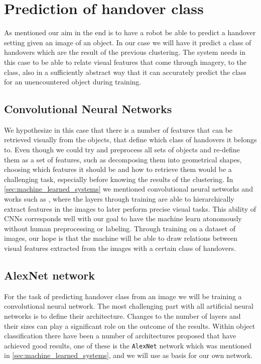 \section{Prediction of handover class}

As mentioned our aim in the end is to have a robot be able to predict a handover setting given an image of an object. In our case we will have it predict a class of handovers which are the result of the previous clustering. The system needs in this case to be able to relate visual features that come through imagery, to the class, also in a sufficiently abstract way that it can accurately predict the class for an unencountered object during training.

\subsection{Convolutional Neural Networks}

We hypothesize in this case that there is a number of features that can be retrieved visually from the objects, that define which class of handovers it belongs to. Even though we could try and preprocess all sets of objects and re-define them as a set of features, such as decomposing them into geometrical shapes, choosing which features it should be and how to retrieve them would be a challenging task, especially before knowing the results of the clustering. In \ref{sec:machine_learned_systems} we mentioned convolutional neural networks and works such as \parencite{Lee2009}, \parencite{Turaga2010} where the layers through training are able to hierarchically extract features in the images to later perform precise visual tasks. This ability of CNNs corresponds well with our goal to have the machine learn atonomously without human preprocessing or labeling. Through training on a dataset of images, our hope is that the machine will be able to draw relations between visual features extracted from the images with a certain class of handovers.

\subsection{AlexNet network}

For the task of predicting handover class from an image we will be training a convolutional neural network. The most challenging part with all artificial neural networks is to define their architecture. Changes to the number of layers and their sizes can play a significant role on the outcome of the results. Within object classification there have been a number of architectures proposed that have achieved good results, one of these is the \texttt{AlexNet} network which was mentioned in \ref{sec:machine_learned_systems}, and we will use as basis for our own network.

